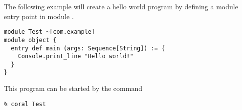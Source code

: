 \example The following example will create a hello world program by defining a module entry point in module . 

\syntax\begin{lstlisting}[morekeywords={entry}]
module Test ~[com.example]
module object {
  entry def main (args: Sequence[String]) := {
    Console.print_line "Hello world!"
  }
}
\end{lstlisting}

This program can be started by the command
\begin{lstlisting}
% coral Test
\end{lstlisting}








